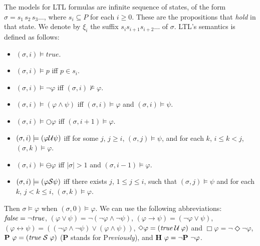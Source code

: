 The models for LTL formulas 
are infinite sequence of states, of the form
$\sigma =  s_{1}\, s_{2}\, s_3 \ldots$,
where $s_i \subseteq P$ for each $i\geq 0$. These are the propositions that {\em hold} in that state.
We denote by $\xi_{i}$ the suffix $s_{i} s_{i+1} s_{i+2}\ldots$ of $\sigma$. 
LTL's semantics is defined as follows:
\begin{itemize}
\item $( \sigma, {i}) \models \mathit{true}$.
\item $(\sigma, {i}) \models p$ iff $p \in s_{i}$.
\item $(\sigma, {i}) \models \neg\varphi$ iff  $(\sigma, {i}) \not\models \varphi$.
\item $(\sigma, {i}) \models ( \varphi \land \psi)$ iff $(\sigma, {i}) \models \varphi$ and $(\sigma, {i} ) \models \psi$.
\item $(\sigma, {i}) \models \bigcirc \varphi$ iff $(\sigma, {i+1}) \models \varphi$.
\item $(\sigma, {i}) \models ( \varphi \cal{U} \psi )$ iff for some $j$,
$j\geq i$, $(\sigma, {j}) \models \psi$,
and for each $k$, $i \leq k < j$, $(\sigma, {k}) \models \varphi$.
\item $(\sigma , i) \models \ominus \varphi$ iff $| \sigma | > 1$ and $(\sigma, i-1) \models \varphi$.
\item $(\sigma , i) \models (\varphi {\cal S} \psi)$ iff there exists $j$, $1 \leq j \leq i$, such that
$(\sigma , j)  \models \psi$ and for each
$k$, $j < k \leq i$, $(\sigma , k ) \models \varphi$.
\end{itemize}
Then $\sigma \models \varphi$ when $( \sigma ,0 ) \models \varphi$.
We can use the following abbreviations:
$\mathit{false} = \neg \mathit{true}$, 
$(\varphi \vee \psi) = \neg ( \neg \varphi \wedge \neg \psi )$, 
$(\varphi \rightarrow \psi) = ( \neg \varphi \vee \psi)$,
$(\varphi \leftrightarrow \psi) = ((\neg \varphi \wedge \neg \psi) \vee (\varphi \wedge \psi ))$,
$\Diamond \varphi = (\mathit{true} \mathbin{\mathcal{U}} \varphi)$ and $\Box \varphi = \neg \Diamond \neg \varphi$,
${\bf P}\  \varphi = (\mathit{true} \; {\cal S} \; \varphi)$ ({\bf P} stands for P{\em reviously}), and 
${\bf H}\  \varphi = \neg {\bf P}\ \neg \varphi$.



